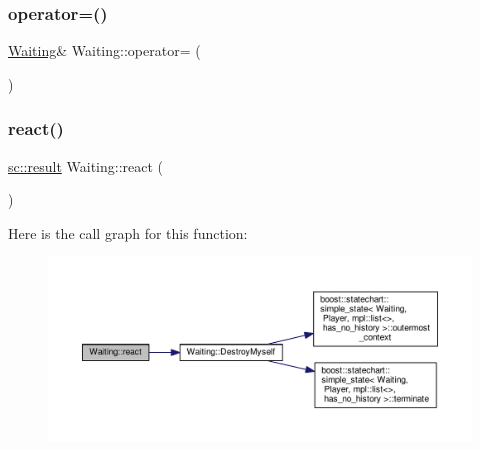 \subsubsection{\texorpdfstring{operator=()}{operator=()}}
{\footnotesize\ttfamily \mbox{\hyperlink{struct_waiting}{Waiting}}\& Waiting\+::operator= (\begin{DoxyParamCaption}\item[{const \mbox{\hyperlink{struct_waiting}{Waiting}} \&}]{ }\end{DoxyParamCaption})\hspace{0.3cm}{\ttfamily [private]}}

\mbox{\label{struct_waiting_afb8322d5f8e33ef42f20a904095afe3d}} 
\subsubsection{\texorpdfstring{react()}{react()}\hspace{0.1cm}{\footnotesize\ttfamily [1/2]}}
{\footnotesize\ttfamily \mbox{\hyperlink{namespaceboost_1_1statechart_abe807f6598b614d6d87bb951ecd92331}{sc\+::result}} Waiting\+::react (\begin{DoxyParamCaption}\item[{const \mbox{\hyperlink{struct_game_aborted}{Game\+Aborted}} \&}]{ }\end{DoxyParamCaption})\hspace{0.3cm}{\ttfamily [inline]}}

Here is the call graph for this function\+:
\nopagebreak
\begin{figure}[H]
\begin{center}
\leavevmode
\includegraphics[width=350pt]{struct_waiting_afb8322d5f8e33ef42f20a904095afe3d_cgraph}
\end{center}
\end{figure}
\mbox{\label{struct_waiting_a8c34737a1eb91381c14fb9647958f41b}} 
